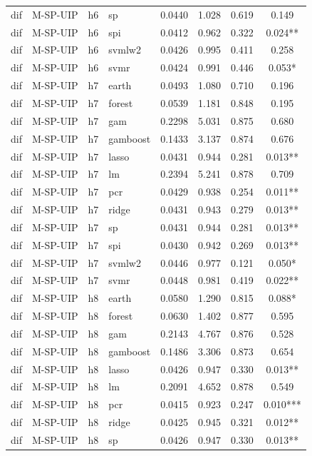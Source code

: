 \begin{ThreePartTable}
\begin{longtable}[t]{llclcccc}
dif & M-SP-UIP & h6 & sp & 0.0440 & 1.028 & 0.619 & 0.149\\
dif & M-SP-UIP & h6 & spi & 0.0412 & 0.962 & 0.322 & 0.024**\\
dif & M-SP-UIP & h6 & svmlw2 & 0.0426 & 0.995 & 0.411 & 0.258\\
dif & M-SP-UIP & h6 & svmr & 0.0424 & 0.991 & 0.446 & 0.053*\\
\addlinespace
dif & M-SP-UIP & h7 & earth & 0.0493 & 1.080 & 0.710 & 0.196\\
dif & M-SP-UIP & h7 & forest & 0.0539 & 1.181 & 0.848 & 0.195\\
dif & M-SP-UIP & h7 & gam & 0.2298 & 5.031 & 0.875 & 0.680\\
dif & M-SP-UIP & h7 & gamboost & 0.1433 & 3.137 & 0.874 & 0.676\\
dif & M-SP-UIP & h7 & lasso & 0.0431 & 0.944 & 0.281 & 0.013**\\
dif & M-SP-UIP & h7 & lm & 0.2394 & 5.241 & 0.878 & 0.709\\
dif & M-SP-UIP & h7 & pcr & 0.0429 & 0.938 & 0.254 & 0.011**\\
dif & M-SP-UIP & h7 & ridge & 0.0431 & 0.943 & 0.279 & 0.013**\\
dif & M-SP-UIP & h7 & sp & 0.0431 & 0.944 & 0.281 & 0.013**\\
dif & M-SP-UIP & h7 & spi & 0.0430 & 0.942 & 0.269 & 0.013**\\
dif & M-SP-UIP & h7 & svmlw2 & 0.0446 & 0.977 & 0.121 & 0.050*\\
dif & M-SP-UIP & h7 & svmr & 0.0448 & 0.981 & 0.419 & 0.022**\\
\addlinespace
dif & M-SP-UIP & h8 & earth & 0.0580 & 1.290 & 0.815 & 0.088*\\
dif & M-SP-UIP & h8 & forest & 0.0630 & 1.402 & 0.877 & 0.595\\
dif & M-SP-UIP & h8 & gam & 0.2143 & 4.767 & 0.876 & 0.528\\
dif & M-SP-UIP & h8 & gamboost & 0.1486 & 3.306 & 0.873 & 0.654\\
dif & M-SP-UIP & h8 & lasso & 0.0426 & 0.947 & 0.330 & 0.013**\\
dif & M-SP-UIP & h8 & lm & 0.2091 & 4.652 & 0.878 & 0.549\\
dif & M-SP-UIP & h8 & pcr & 0.0415 & 0.923 & 0.247 & 0.010***\\
dif & M-SP-UIP & h8 & ridge & 0.0425 & 0.945 & 0.321 & 0.012**\\
dif & M-SP-UIP & h8 & sp & 0.0426 & 0.947 & 0.330 & 0.013**\\

\end{longtable}
\end{ThreePartTable}
